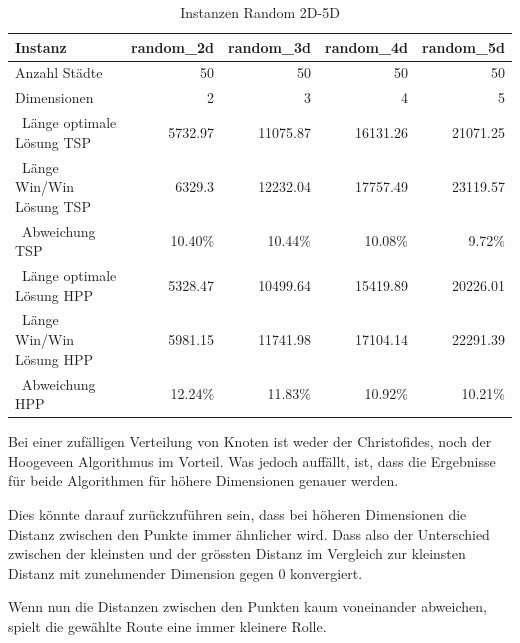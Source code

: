 \documentclass[11pt,a4paper]{article}
\begin{document}
\begin{table}[H]
        \centering
        \begin{tabular}{| l | r | r | r | r |}
            \hline
            Instanz                     & \textbf{random\_2d}
                                        & \textbf{random\_3d}
                                        & \textbf{random\_4d}
                                        & \textbf{random\_5d} \\ \hline
            Anzahl Städte               & 50        & 50        & 50        & 50            \\ \hline
            Dimensionen                 & 2         & 3         & 4         & 5       \\ \hline
            \ Länge optimale Lösung TSP   & 5732.97   & 11075.87  & 16131.26  & 21071.25  \\ \hline
            \ Länge Win/Win Lösung  TSP   & 6329.3    & 12232.04  & 17757.49  & 23119.57  \\ \hline
            \ Abweichung TSP              & 10.40\%   & 10.44\%   & 10.08\%   & 9.72\%    \\ \hline
            \ Länge optimale Lösung HPP   & 5328.47   & 10499.64  & 15419.89  & 20226.01  \\ \hline
            \ Länge Win/Win Lösung  HPP   & 5981.15   & 11741.98  & 17104.14  & 22291.39  \\ \hline
            \ Abweichung HPP              & 12.24\%   & 11.83\%   & 10.92\%   & 10.21\%   \\ \hline
        \end{tabular}
        \caption{Instanzen Random 2D-5D}
        \label{tab:instanzen_random}
\end{table}

Bei einer zufälligen Verteilung von Knoten ist weder der Christofides, noch der Hoogeveen Algorithmus im Vorteil. Was jedoch auffällt, ist, dass die Ergebnisse für beide Algorithmen für höhere Dimensionen genauer werden.

Dies könnte darauf zurückzuführen sein, dass bei höheren Dimensionen die Distanz zwischen den Punkte immer ähnlicher wird. Dass also der Unterschied zwischen der kleinsten und der grössten Distanz im Vergleich zur kleinsten Distanz mit zunehmender Dimension gegen 0 konvergiert.\cite{beyer99}

Wenn nun die Distanzen zwischen den Punkten kaum voneinander abweichen, spielt die gewählte Route eine immer kleinere Rolle.
\end{document}
